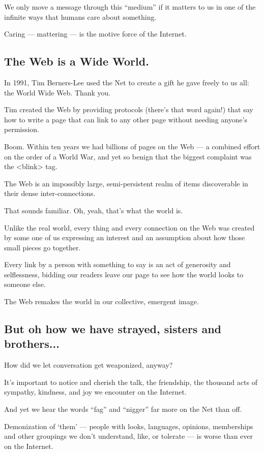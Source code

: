 \documentclass[letterpaper,12pt,english]{sphinxmanual}
\begin{document}
We only move a message through this ``medium'' if it matters to us in one of the infinite ways that humans care about something.

Caring — mattering — is the motive force of the Internet.


\subsection{The Web is a Wide World.}
\label{2015newclues:the-web-is-a-wide-world}
In 1991, Tim Berners-Lee used the Net to create a gift he gave freely to us all: the World Wide Web. Thank you.

Tim created the Web by providing protocols (there's that word again!) that say how to write a page that can link to any other page without needing anyone's permission.

Boom. Within ten years we had billions of pages on the Web — a combined effort on the order of a World War, and yet so benign that the biggest complaint was the \textless{}blink\textgreater{} tag.

The Web is an impossibly large, semi-persistent realm of items discoverable in their dense inter-connections.

That sounds familiar. Oh, yeah, that's what the world is.

Unlike the real world, every thing and every connection on the Web was created by some one of us expressing an interest and an assumption about how those small pieces go together.

Every link by a person with something to say is an act of generosity and selflessness, bidding our readers leave our page to see how the world looks to someone else.

The Web remakes the world in our collective, emergent image.


\subsection{But oh how we have strayed, sisters and brothers...}
\label{2015newclues:but-oh-how-we-have-strayed-sisters-and-brothers}
How did we let conversation get weaponized, anyway?

It's important to notice and cherish the talk, the friendship, the thousand acts of sympathy, kindness, and joy we encounter on the Internet.

And yet we hear the words ``fag'' and ``nigger'' far more on the Net than off.

Demonization of `them' — people with looks, languages, opinions, memberships and other groupings we don't understand, like, or tolerate — is worse than ever on the Internet.
\end{document}
